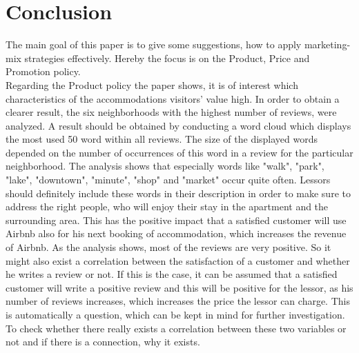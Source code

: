 \documentclass[journal]{IEEEtran}
\begin{document}
\section{Conclusion}
\noindent The main goal of this paper is to give some suggestions, how to apply marketing-mix strategies effectively. Hereby the focus is on the Product, Price and Promotion policy.\\
Regarding the Product policy the paper shows, it is of interest which characteristics of the accommodations visitors’ value high. In order to obtain a clearer result, the six neighborhoods with the highest number of reviews, were analyzed. A result should be obtained by conducting a word cloud which displays the most used 50 word within all reviews. The size of the displayed words depended on the number of occurrences of this word in a review for the particular neighborhood. The analysis shows that especially words like "walk", "park", "lake", "downtown", "minute", "shop" and "market" occur quite often. Lessors should definitely include these words in their description in order to make sure to address the right people, who will enjoy their stay in the apartment and the surrounding area. This has the positive impact that a satisfied customer will use Airbnb also for his next booking of accommodation, which increases the revenue of Airbnb. As the analysis shows, most of the reviews are very positive. So it might also exist a correlation between the satisfaction of a customer and whether he writes a review or not. If this is the case, it can be assumed that a satisfied customer will write a positive review and this will be positive for the lessor, as his number of reviews increases, which increases the price the lessor can charge. This is automatically a question, which can be kept in mind for further investigation. To check whether there really exists a correlation between these two variables or not and if there is a connection, why it exists.\\
\end{document}
